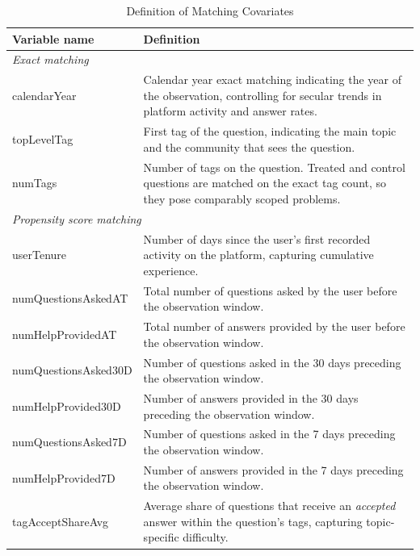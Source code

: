 \begin{table}
\caption{Definition of Matching Covariates}
\label{tab:covariates}
\centering\small
\begin{tabular}{p{4cm} p{9cm}}
\toprule
\textbf{Variable name} & \textbf{Definition} \\
\midrule
\textit{Exact matching} & \\
calendarYear & Calendar year exact matching indicating the year of the observation, controlling for secular trends in platform activity and answer rates. \\
topLevelTag & First tag of the question, indicating the main topic and the community that sees the question. \\
numTags & Number of tags on the question. Treated and control questions are matched on the exact tag count, so they pose comparably scoped problems. \\

\multicolumn{2}{l}{\textit{Propensity score matching}}\\
userTenure & Number of days since the user's first recorded activity on the platform, capturing cumulative experience. \\
numQuestionsAskedAT & Total number of questions asked by the user before the observation window. \\

numHelpProvidedAT & Total number of answers provided by the user before the observation window. \\

numQuestionsAsked30D & Number of questions asked in the 30 days preceding the observation window. \\

numHelpProvided30D & Number of answers provided in the 30 days preceding the observation window. \\

numQuestionsAsked7D & Number of questions asked in the 7 days preceding the observation window. \\

numHelpProvided7D & Number of answers provided in the 7 days preceding the observation window. \\

tagAcceptShareAvg & Average share of questions that receive an \emph{accepted} answer within the question's tags, capturing topic-specific difficulty. \\


\end{tabular}
\end{table}
